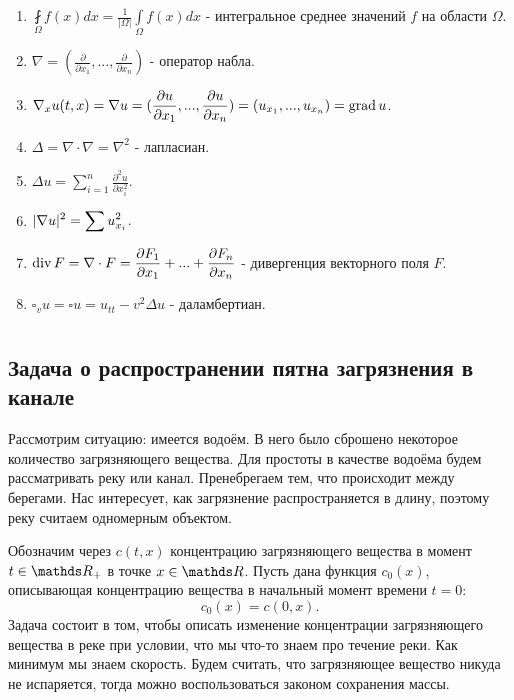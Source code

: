 \begin{enumerate}
\item $\displaystyle \fint \limits_{\Omega} f(x) dx = \frac{1}{|\Omega|} \int \limits_{\Omega} f(x) dx$ - интегральное среднее значений $f$ на области $\Omega$.
\item $\displaystyle \nabla = (\frac {\partial} {\partial x_1}, ... , \frac {\partial} {\partial x_n}) $ - оператор набла.
\item $\displaystyle \nabla_x u(t,x)  = \nabla u = (\frac {\partial u} {\partial x_1}, ..., \frac {\partial u} {\partial x_n}) = (u_{x_1}, ..., u_{x_n}) = \operatorname{grad} u $.
\item $\displaystyle \Delta = \nabla \cdot \nabla = \nabla^2$ - лапласиан.
\item $\displaystyle \Delta u = \sum \limits_{i=1}^n \frac {\partial^2 u} {\partial x_i^2}$.
\item $\displaystyle \lvert\nabla u\rvert^2 = \sum u_{x_i}^2$.
\item $\displaystyle \operatorname{div} F = \nabla \cdot F = \frac {\partial F_1} {\partial x_1} + ... + \frac {\partial F_n} {\partial x_n}$ - дивергенция векторного поля $F$.
\item $\square_v u = \square u = u_{tt} - v^2 \Delta u$ - даламбертиан.

\end{enumerate}

\chapter{}
\section{Задача о распространении пятна загрязнения в канале}
Рассмотрим ситуацию: имеется водоём. В него было сброшено некоторое количество загрязняющего вещества.
Для простоты в качестве водоёма будем рассматривать реку или канал. Пренебрегаем тем, что происходит между берегами. Нас интересует, как загрязнение распространяется в длину, поэтому реку считаем одномерным объектом.

Обозначим через $c (t, x) $ концентрацию загрязняющего вещества в момент $t \in \real_+$ в точке $x \in \real$. Пусть дана функция $ c_0 (x) $, описывающая концентрацию вещества в начальный момент времени $ t = 0 $:
$$ c_0 (x) = c (0, x).$$
Задача состоит в том, чтобы описать изменение концентрации загрязняющего вещества в реке при условии, что мы что-то знаем про течение реки. Как минимум мы знаем скорость. Будем считать, что загрязняющее вещество никуда не испаряется, тогда можно воспользоваться законом сохранения массы.


